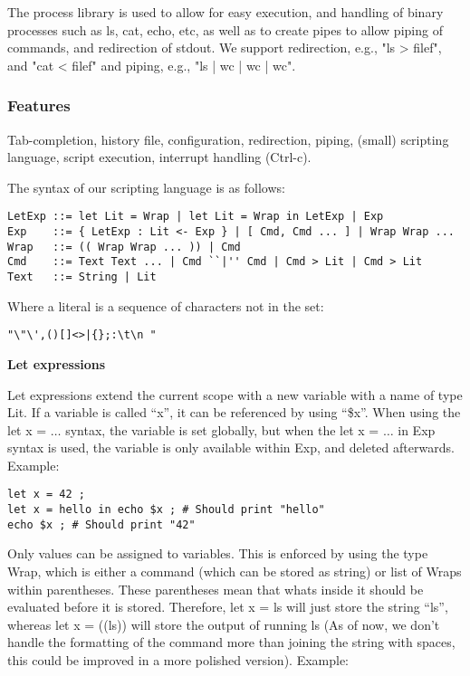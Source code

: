 \documentclass[11pt,a4paper]{article}
\begin{document}
The process library is used to allow for easy execution, and handling of binary
processes such as ls, cat, echo, etc, as well as to create pipes to allow
piping of commands, and redirection of stdout. We support redirection, e.g.,
"ls > filef", and "cat < filef" and piping, e.g., "ls | wc | wc | wc".

\subsubsection{Features}
Tab-completion, history file, configuration, redirection, piping, (small)
scripting language, script execution, interrupt handling (Ctrl-c).

The syntax of our scripting language is as follows:

\begin{verbatim}
LetExp ::= let Lit = Wrap | let Lit = Wrap in LetExp | Exp
Exp    ::= { LetExp : Lit <- Exp } | [ Cmd, Cmd ... ] | Wrap Wrap ...
Wrap   ::= (( Wrap Wrap ... )) | Cmd
Cmd    ::= Text Text ... | Cmd ``|'' Cmd | Cmd > Lit | Cmd > Lit
Text   ::= String | Lit
\end{verbatim}

Where a literal is a sequence of characters not in the set:
\begin{verbatim}
"\"\',()[]<>|{};:\t\n "
\end{verbatim}

\textbf{Let expressions}

Let expressions extend the current scope with a new variable with a name of
type Lit. If a variable is called ``x'', it can be referenced by using ``\$x''.
When using the let x = $\dots$ syntax, the variable is set globally, but when
the let x = $\dots$ in Exp syntax is used, the variable is only available
within Exp, and deleted afterwards. Example:

\begin{verbatim}
let x = 42 ;
let x = hello in echo $x ; # Should print "hello"
echo $x ; # Should print "42"
\end{verbatim}

Only values can be assigned to variables. This is enforced by using the type
Wrap, which is either a command (which can be stored as string) or list of
Wraps within parentheses. These parentheses mean that whats inside it should be
evaluated before it is stored. Therefore, let x = ls will just store the string
``ls'', whereas let x = ((ls)) will store the output of running ls (As of now,
we don't handle the formatting of the command more than joining the string with
spaces, this could be improved in a more polished version). Example:
\end{document}
